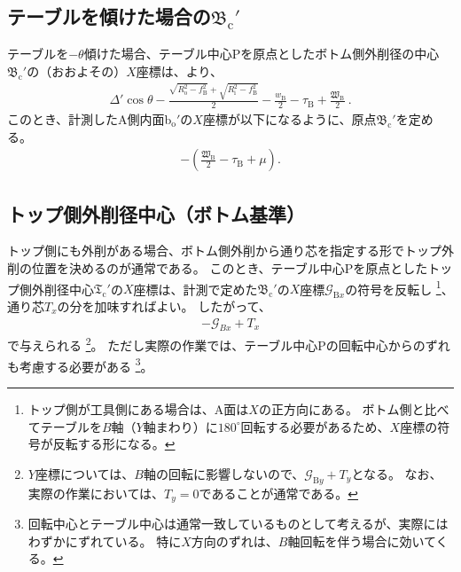 \subsection[テーブルを傾けた場合の\texorpdfstring{$\mathfrak B_\mathrm c'$}{Bc'}]
           {テーブルを傾けた場合の$\boldsymbol{\mathfrak B_\mathrm c'}$}
テーブルを$-\theta$傾けた場合、テーブル中心Pを原点としたボトム側外削径の中心$\mathfrak B_\mathrm c'$の（おおよその）$X$座標は、より、
\begin{align}
  \label{eq:gaisakucenterBt}
  \varDelta'\cos\theta-\frac{\sqrt{R_\mathrm o^2-f_\mathrm B^2}+\sqrt{R_\mathrm i^2-f_\mathrm B^2}}2
  -\frac{w_\mathrm B}2-\tau_\mathrm B+\frac{\mathfrak W_\mathrm B}2\ .
\end{align}
このとき、計測したA側内面b$_\mathrm o'$の$X$座標が以下になるように、原点$\mathfrak B_\mathrm c'$を定める。
\begin{align}
  \label{eq:gaisakucenterBr}
  -\left(\frac{\mathfrak W_\mathrm B}2-\tau_\mathrm B+\mu\right).
\end{align}


\subsection{トップ側外削径中心（ボトム基準）}
トップ側にも外削がある場合、ボトム側外削から通り芯を指定する形でトップ外削の位置を決めるのが通常である。
このとき、テーブル中心Pを原点としたトップ側外削径中心$\mathfrak T_\mathrm c'$の$X$座標は、計測で定めた$\mathfrak B_\mathrm c'$の$X$座標$\mathcal G_{\mathrm Bx}$の符号を反転し
\footnote{トップ側が工具側にある場合は、A面は$X$の正方向にある。
ボトム側と比べてテーブルを$B$軸（$Y$軸まわり）に$180^\circ$回転する必要があるため、$X$座標の符号が反転する形になる。}、
通り芯$T_x$の分を加味すればよい。
したがって、
\begin{align}
  \label{eq:BbasedTx}
  -\mathcal G_{Bx}+T_x
\end{align}
で与えられる
\footnote{$Y$座標については、$B$軸の回転に影響しないので、$\mathcal G_{\mathrm By}+T_y$となる。
なお、実際の作業においては、$T_y = 0$であることが通常である。}。
ただし実際の作業では、テーブル中心Pの回転中心からのずれも考慮する必要がある
\footnote{回転中心とテーブル中心は通常一致しているものとして考えるが、実際にはわずかにずれている。
特に$X$方向のずれは、$B$軸回転を伴う場合に効いてくる。}。




